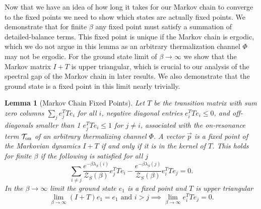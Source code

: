 \documentclass{article}
\newtheorem{lemma}[theorem]{Lemma}
\newcommand{\on}{\rm on}
\newcommand{\TT}{\mathcal{T}}
\newcommand{\partfun}{\mathcal{Z}}
\begin{document}
Now that we have an idea of how long it takes for our Markov chain to converge to the fixed points we need to show which states are actually fixed points. We demonstrate that for finite $\beta$ any fixed point must satisfy a summation of detailed-balance terms. This fixed point is unique if the Markov chain is ergodic, which we do not argue in this lemma as an arbitrary thermalization channel $\Phi$ may not be ergodic. For the ground state limit of $\beta \to \infty$ we show that the Markov matrix $I + T$ is upper triangular, which is crucial to our analysis of the spectral gap of the Markov chain in later results. We also demonstrate that the ground state is a fixed point in this limit nearly trivially.
\begin{lemma}[Markov Chain Fixed Points]\label{lem:fixed_point}
    Let $T$ be the transition matrix with sum zero columns $\sum_j e_j^T T e_i$ for all $i$, negative diagonal entries $e_i^T T e_i \leq 0$, and off-diagonals smaller than 1 $e_j^T T e_i \leq 1$ for $j \neq i$, associated with the on-resonance term $\TT_{\on}$ of an arbitrary thermalizing channel $\Phi$. A vector $\vec{p}$ is a fixed point of the Markovian dynamics $I + T$ if and only if it is in the kernel of $T$. This holds for finite $\beta$ if the following is satisfied for all $j$
    \begin{equation}
        \sum_{i \neq j} \frac{e^{-\beta \lambda_S(i)}}{\partfun_S(\beta)} e_j^T T e_i - \frac{e^{-\beta \lambda_S(j)}}{\partfun_S(\beta)} e_i^T T e_j = 0.\label{eq:detailed_balance}
    \end{equation}
    In the $\beta \to \infty$ limit the ground state $e_1$ is a fixed point and $T$ is upper triangular
    \begin{equation}
        \lim_{\beta \to \infty} (I + T) e_1 = e_1 \text{ and }i > j \implies \lim_{\beta \to \infty} e_i^T T e_j = 0.
    \end{equation}
\end{lemma}
\end{document}

